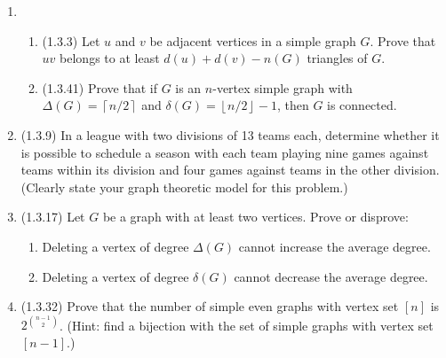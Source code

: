 \documentclass[11pt]{amsart}
\newcommand{\ceil}[1]{\left\lceil#1\right\rceil}
\newcommand{\floor}[1]{\left\lfloor#1\right\rfloor}
\begin{document}
\begin{enumerate}[P1]
\item 
\begin{enumerate}
\item (1.3.3)   Let $u$ and $v$ be adjacent vertices in a simple graph $G$.  Prove that $uv$ belongs to at least $d(u)+d(v)-n(G)$ triangles of $G$.
\item (1.3.41) Prove that if $G$ is an $n$-vertex simple graph with $\Delta(G)=\ceil{n/2}$ and $\delta(G)=\floor{n/2}-1$, then $G$ is connected.
\end{enumerate}

\item (1.3.9)  In a league with two divisions of 13 teams each, determine whether it is possible to schedule a season with each team playing nine games against teams within its division and four games against teams in the other division.  (Clearly state your graph theoretic model for this problem.)
\item (1.3.17)  Let $G$ be a graph with at least two vertices.  Prove or disprove:
\begin{enumerate}
\item Deleting a vertex of degree $\Delta(G)$ cannot increase the average degree.
\item Deleting a vertex of degree $\delta(G)$ cannot decrease the average degree.
\end{enumerate}
\item (1.3.32)  Prove that the number of simple even graphs with vertex set $[n]$ is $\displaystyle 2^{\binom{n-1}{2}}$.  (Hint: find a bijection with the set of simple graphs with vertex set $[n-1]$.)

\end{enumerate}


\vfill
\begin{quotation}
\footnotesize
\end{quotation}
\end{document}
